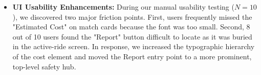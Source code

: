 \begin{itemize}
    \item \textbf{UI Usability Enhancements:} During our manual usability testing ($N=10$), we discovered two major friction points. First, users frequently missed the "Estimated Cost" on match cards because the font was too small. Second, 8 out of 10 users found the "Report" button difficult to locate as it was buried in the active-ride screen. In response, we increased the typographic hierarchy of the cost element and moved the Report entry point to a more prominent, top-level safety hub.

\end{itemize}